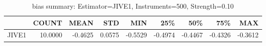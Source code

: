 \begin{table}[ht]
\centering
\caption{bias summary: Estimator=JIVE1, Instruments=500, Strength=0.10}
\begin{tabular}{lrrrrrrrr}
\toprule
 & COUNT & MEAN & STD & MIN & 25\% & 50\% & 75\% & MAX \\
\midrule
JIVE1 & 10.0000 & -0.4625 & 0.0575 & -0.5529 & -0.4974 & -0.4467 & -0.4326 & -0.3612 \\
\bottomrule
\end{tabular}
\end{table}
